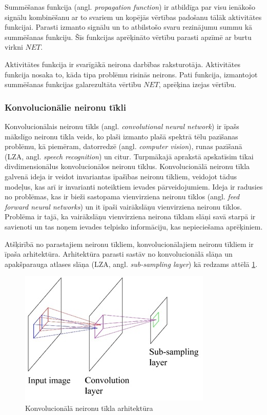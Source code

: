\documentclass[12pt,paper=a4]{report}
\begin{document}
Summēšanas funkcija (angl. \textit{propagation function}) ir atbildīga par visu ienākošo signālu kombinēšanu ar to svariem un kopējās vērtības padošanu tālāk aktivitātes funkcijai. Parasti izmanto signālu un to atbilstošo svaru rezinājumu summu kā summēšanas funkciju. Šīs funkcijas aprēķināto vērtību parasti apzīmē ar burtu virkni $NET$.\cite{zutersNeironuTikli}\par
Aktivitātes funkcija ir svarīgākā neirona darbības raksturotāja. Aktivitātes funkcija nosaka to, kāda tipa problēmu risinās neirons. Pati funkcija, izmantojot summēšanas funkcijas galarezultāta vērtību $NET$, aprēķina izejas vērtību.\cite{zutersNeironuTikli}
\subsubsection{Konvolucionālie neironu tīkli}
Konvolucionālais neironu tīkls (angl. \textit{convolutional neural network}) ir īpašs mākslīgo neironu tīkla veids, ko plaši izmanto plašā spektrā tēlu pazīšanas problēmu, kā piemēram, datorredzē (angl. \textit{computer vision}), runas pazīšanā (LZA, angl. \textit{speech recognition}) un citur. Turpmākajā aprakstā apskatīsim tikai divdimensionālus konvolucionālos neironu tīklus. Konvolucionālā neironu tīkla galvenā ideja ir veidot invariantas īpašības neironu tīkliem, veidojot tādus modeļus, kas arī ir invarianti noteiktiem ievades pārveidojumiem. Ideja ir radusies no problēmas, kas ir bieži sastopama vienvirziena neironu tīklos (angl. \textit{feed forward neural networks}) un it īpaši vairākslāņu vienvirziena neironu tīklos. Problēma ir tajā, ka vairākslāņu vienvirziena neirona tīklam slāņi savā starpā ir savienoti un tas noņem ievades telpisko informāciju, kas nepieciešama aprēķiniem.\cite{fukushima1982}\par
Atšķirībā no parastajiem neironu tīkliem, konvolucionālajiem neironu tīkliem ir īpaša arhitektūra. Arhitektūra parasti sastāv no konvolucionālā slāņa un apakšparauga atlases slāņa (LZA, angl. \textit{sub-sampling layer}) kā redzams attēlā \ref{fig:architecture}.
\begin{figure}[h!]
\centering
\includegraphics[width=.5\linewidth]{convArchitecture}
\caption{Konvolucionālā neironu tīkla arhitektūra \cite{convolutionalNN}}
\label{fig:architecture}
\end{figure}
\end{document}

